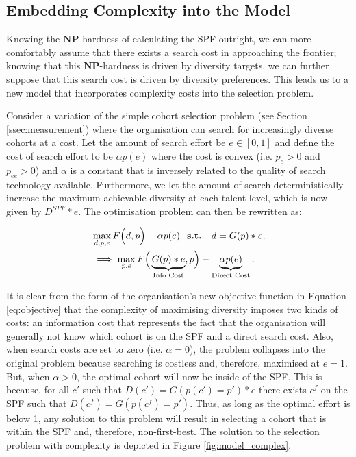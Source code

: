 \subsection{Embedding Complexity into the Model}\label{subsec:dts_w_complexity}
Knowing the $\mathbf{NP}$-hardness of calculating the SPF outright, we can more comfortably assume that there exists a search cost in approaching the frontier; knowing that this $\mathbf{NP}$-hardness is driven by diversity targets, we can further suppose that this search cost is driven by diversity preferences. This leads us to a new model that incorporates complexity costs into the selection problem.

Consider a variation of the simple cohort selection problem (see Section \ref{ssec:measurement}) where the organisation can search for increasingly diverse cohorts at a cost. Let the amount of search effort be $e\in[0,1]$ and define the cost of search effort to be $\alpha p(e)$ where the cost is convex (i.e. $p_e>0$ and $p_{ee}>0$) and $\alpha$ is a constant that is inversely related to the quality of search technology available. Furthermore, we let the amount of search deterministically increase the maximum achievable diversity at each talent level, which is now given by $D^{SPF}*e$. The optimisation problem can then be rewritten as:

\begin{align}
&\max_{d,p,e} F\Big(d,p\Big) - \alpha p(e) \text{ \bf{ s.t. } } d = G(p)*e, \nonumber \\ 
& \implies \max_{p,e} F\Big(\underbrace{G(p)*e}_{\text{Info Cost}} ,p\Big) - \underbrace{\alpha p(e)}_{\text{Direct Cost}}. \label{eq:objective}
\end{align}

It is clear from the form of the organisation's new objective function in Equation \ref{eq:objective} that the complexity of maximising diversity imposes two kinds of costs: an information cost that represents the fact that the organisation will generally not know which cohort is on the SPF and a direct search cost. Also, when search costs are set to zero (i.e. $\alpha=0$), the problem collapses into the original problem because searching is costless and, therefore, maximised at $e=1$. But, when $\alpha>0$, the optimal cohort will now be inside of the SPF. This is because, for all $c'$ such that  $D(c')=G(p(c')=p')*e$ there exists $c^f$ on the SPF such that $D(c^f)=G(p(c^f)=p')$. Thus, as long as the optimal effort is below 1, any solution to this problem will result in selecting a cohort that is within the SPF and, therefore, non-first-best. The solution to the selection problem with complexity is depicted in Figure \ref{fig:model_complex}.

